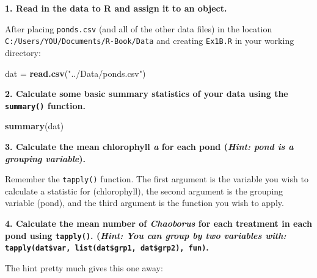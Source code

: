 \documentclass[]{book}
\newenvironment{Shaded}{\begin{snugshade}}{\end{snugshade}}
\newcommand{\KeywordTok}[1]{\textcolor[rgb]{0.13,0.29,0.53}{\textbf{#1}}}
\newcommand{\NormalTok}[1]{#1}
\newcommand{\OperatorTok}[1]{\textcolor[rgb]{0.81,0.36,0.00}{\textbf{#1}}}
\newcommand{\StringTok}[1]{\textcolor[rgb]{0.31,0.60,0.02}{#1}}
\begin{document}
\textbf{1. Read in the data to R and assign it to an object.}

After placing \texttt{ponds.csv} (and all of the other data files) in the location \texttt{C:/Users/YOU/Documents/R-Book/Data} and creating \texttt{Ex1B.R} in your working directory:

\begin{Shaded}
\begin{Highlighting}[]
\NormalTok{dat =}\StringTok{ }\KeywordTok{read.csv}\NormalTok{(}\StringTok{"../Data/ponds.csv"}\NormalTok{)}
\end{Highlighting}
\end{Shaded}

\textbf{2. Calculate some basic summary statistics of your data using the \texttt{summary()} function.}

\begin{Shaded}
\begin{Highlighting}[]
\KeywordTok{summary}\NormalTok{(dat)}
\end{Highlighting}
\end{Shaded}

\textbf{3. Calculate the mean chlorophyll \emph{a} for each pond (\emph{Hint: pond is a grouping variable}).}

Remember the \texttt{tapply()} function. The first argument is the variable you wish to calculate a statistic for (chlorophyll), the second argument is the grouping variable (pond), and the third argument is the function you wish to apply.

\begin{Shaded}
\end{Shaded}

\textbf{4. Calculate the mean number of \emph{Chaoborus} for each treatment in each pond using \texttt{tapply()}. (\emph{Hint: You can group by two variables with:} \texttt{tapply(dat\$var,\ list(dat\$grp1,\ dat\$grp2),\ fun)}.}

The hint pretty much gives this one away:

\begin{Shaded}
\end{Shaded}
\end{document}
